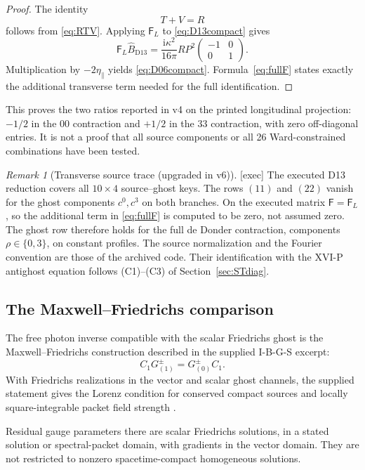\documentclass[11pt,a4paper]{article}
\newcommand{\ka}{\kappa}
\newcommand{\ii}{\mathrm i}
\newcommand{\loc}[1]{\nolinkurl{#1}}
\theoremstyle{plain}
\theoremstyle{definition}
\theoremstyle{remark}
\newtheorem{remark}[theorem]{Remark}
\numberwithin{equation}{section}
\begin{document}
\begin{proof}
The identity
\[
T+V=R
\]
follows from \eqref{eq:RTV}.
Applying \(\mathsf F_L\) to \eqref{eq:D13compact} gives
\[
\mathsf F_L\widehat B_{\mathrm{D13}}
 =\frac{\ii\ka^2}{16\pi}RP^2
 \begin{pmatrix}-1&0\\0&1\end{pmatrix}.
\]
Multiplication by \(-2\eta_\parallel\) yields
\eqref{eq:D06compact}. Formula~\eqref{eq:fullF} states
exactly the additional transverse term needed for the full
identification.
\end{proof}

This proves the two ratios reported in v4 on the printed
longitudinal projection:
\(-1/2\) in the \(00\) contraction and \(+1/2\) in the
\(33\) contraction, with zero off-diagonal entries.
It is not a proof that all source components or all 26
Ward-constrained combinations have been tested.

\begin{remark}[Transverse source trace (upgraded in v6)]
\label{rem:transtrace}
\textsf{[exec]} The executed D13 reduction covers all \(10\times4\)
source--ghost keys.
The rows \((11)\) and \((22)\) vanish for the ghost components
\(c^0,c^3\) on both branches.
On the executed matrix \(\mathsf F=\mathsf F_L\), so the additional
term in \eqref{eq:fullF} is computed to be zero, not assumed zero.
The ghost row therefore holds for the full de Donder contraction,
components \(\rho\in\{0,3\}\), on constant profiles.
The source normalization and the Fourier convention are those of
the archived code. Their identification with the XVI-P antighost
equation follows (C1)--(C3) of Section~\ref{sec:STdiag}.
\end{remark}

\subsection{The Maxwell--Friedrichs comparison}

The free photon inverse compatible with the scalar Friedrichs
ghost is the Maxwell--Friedrichs construction described in the
supplied I-B-G-S excerpt:
\[
C_1G^\pm_{(1)}=G^\pm_{(0)}C_1.
\]
With Friedrichs realizations in the vector and scalar ghost channels,
the supplied statement gives the Lorenz condition for conserved
compact sources and locally square-integrable packet field strength
\cite[{\loc{thm:spin1}}]{CheungIBGS}.

Residual gauge parameters there are scalar Friedrichs solutions,
in a stated solution or spectral-packet domain, with gradients
in the vector domain. They are not restricted to nonzero
spacetime-compact homogeneous solutions.
\end{document}
